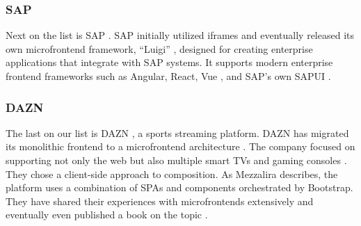 \subsubsection*{SAP}
Next on the list is SAP \cite{SAP}. SAP initially utilized iframes and eventually released its own microfrontend framework, ``Luigi'' \cite{Luigi}, designed for creating enterprise applications that integrate with SAP systems. It supports modern enterprise frontend frameworks such as Angular, React, Vue \cite{Vue}, and SAP's own SAPUI \cite{MezzaliraBuildingMf}.

\subsubsection*{DAZN}
The last on our list is DAZN \cite{DAZN}, a sports streaming platform. DAZN has migrated its monolithic frontend to a microfrontend architecture \cite{Geers}. The company focused on supporting not only the web but also multiple smart TVs and gaming consoles \cite{MezzaliraBuildingMf}. They chose a client-side approach to composition. As Mezzalira \cite{MezzaliraBuildingMf} describes, the platform uses a combination of SPAs and components orchestrated by Bootstrap. They have shared their experiences with microfrontends extensively and eventually even published a book on the topic \cite{MezzaliraBuildingMf}.